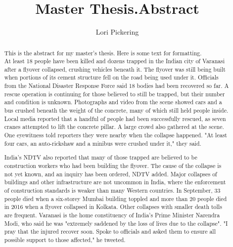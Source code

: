 \documentclass[../../main/main.tex]{subfiles}
\begin{document}
\title{Master Thesis.Abstract}
\author{Lori Pickering}
\begin{abstract}


This is the abstract for my master's thesis.  Here is some text for formatting.\\

At least 18 people have been killed and dozens trapped in the Indian city of Varanasi after a flyover collapsed, crushing vehicles beneath it.
The flyover was still being built when portions of its cement structure fell on the road being used under it.
Officials from the National Disaster Response Force said 18 bodies had been recovered so far.
A rescue operation is continuing for those believed to still be trapped, but their number and condition is unknown.
Photographs and video from the scene showed cars and a bus crushed beneath the weight of the concrete, many of which still held people inside.
Local media reported that a handful of people had been successfully rescued, as seven cranes attempted to lift the concrete pillar. A large crowd also gathered at the scene.
One eyewitness told reporters they were nearby when the collapse happened. "At least four cars, an auto-rickshaw and a minibus were crushed under it," they said.

India's NDTV also reported that many of those trapped are believed to be construction workers who had been building the flyover.
The cause of the collapse is not yet known, and an inquiry has been ordered, NDTV added.
Major collapses of buildings and other infrastructure are not uncommon in India, where the enforcement of construction standards is weaker than many Western countries.
In September, 33 people died when a six-storey Mumbai building toppled and more than 20 people died in 2016 when a flyover collapsed in Kolkata.
Other collapses with smaller death tolls are frequent.
Varanasi is the home constituency of India's Prime Minister Narendra Modi, who said he was "extremely saddened by the loss of lives due to the collapse".
"I pray that the injured recover soon. Spoke to officials and asked them to ensure all possible support to those affected," he tweeted.
\end{abstract}
\end{document}
